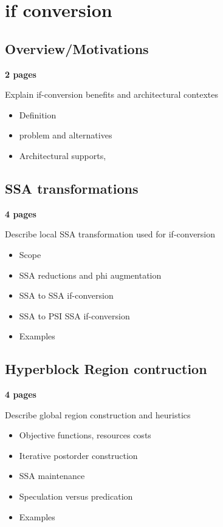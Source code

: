 \applynumberofpages\chapter{if conversion }

\section{Overview/Motivations}

\textbf{2 pages}

Explain if-conversion benefits and architectural contextes

    \begin{itemize}

    \item Definition 

    \item problem and alternatives

    \item Architectural supports, 

    \end{itemize}

\section{SSA transformations}

\textbf{4 pages}

Describe local SSA transformation used for if-conversion

    \begin{itemize}

    \item Scope

    \item SSA reductions and phi augmentation

    \item SSA to SSA if-conversion

    \item SSA to PSI SSA if-conversion

    \item Examples

    \end{itemize}

\section{Hyperblock Region contruction}

\textbf{4 pages}

Describe global region construction and heuristics

    \begin{itemize}

    \item Objective functions, resources costs

    \item Iterative postorder construction

    \item SSA maintenance

    \item Speculation versus predication

    \item Examples

    \end{itemize}




